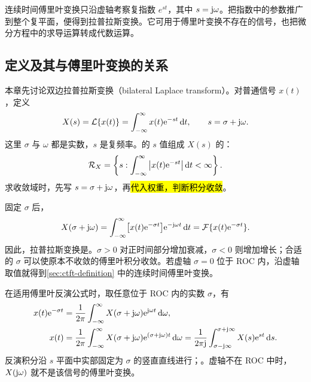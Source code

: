 连续时间傅里叶变换只沿虚轴考察复指数 $e^{st}$，其中 $s=\mathrm{j}\omega$。把指数中的参数推广到整个复平面，便得到拉普拉斯变换。它可用于傅里叶变换不存在的信号，也把微分方程中的求导运算转成代数运算。

\subsection{定义及其与傅里叶变换的关系}
\label{subsec:laplace-definition}

本章先讨论双边拉普拉斯变换（bilateral Laplace transform）。对普通信号 $x(t)$，定义
\begin{equation}
  X(s)=\mathcal{L}\{x(t)\}
  =\int_{-\infty}^{\infty}x(t)\mathrm{e}^{-st}\mathop{}\!\mathrm{d} t,
  \qquad s=\sigma+\mathrm{j}\omega.
  \label{eq:laplace-definition}
\end{equation}
这里 $\sigma$ 与 $\omega$ 都是实数，$s$ 是复频率。的 $s$ 值组成 $X(s)$ 的：
\begin{equation}
  \mathcal R_X
  =\left\{s:\int_{-\infty}^{\infty}
      \left|x(t)\mathrm{e}^{-st}\right|\mathop{}\!\mathrm{d} t<\infty\right\}.
  \label{eq:laplace-roc-definition}
\end{equation}
求收敛域时，先写 $s=\sigma+\mathrm{j}\omega$，再\hl{代入权重，判断积分收敛}。

固定 $\sigma$ 后，
\begin{equation}
  X(\sigma+\mathrm{j}\omega)
  =\int_{-\infty}^{\infty}
    \bigl[x(t)\mathrm{e}^{-\sigma t}\bigr]\mathrm{e}^{-\mathrm{j}\omega t}\mathop{}\!\mathrm{d} t
  =\mathcal{F}\{x(t)\mathrm{e}^{-\sigma t}\}.
  \label{eq:laplace-fourier-link}
\end{equation}
因此，拉普拉斯变换是。$\sigma>0$ 对正时间部分增加衰减，$\sigma<0$ 则增加增长；合适的 $\sigma$ 可以使原本不收敛的傅里叶积分收敛。若虚轴 $\sigma=0$ 位于 ROC 内，沿虚轴取值就得到\cref{sec:ctft-definition} 中的连续时间傅里叶变换。

在适用傅里叶反演公式时，取任意位于 ROC 内的实数 $\sigma$，有
\begin{align}
  x(t)\mathrm{e}^{-\sigma t}
  &=\frac{1}{2\pi}\int_{-\infty}^{\infty}
    X(\sigma+\mathrm{j}\omega)\mathrm{e}^{\mathrm{j}\omega t}\mathop{}\!\mathrm{d}\omega,\\
  x(t)
  &=\frac{1}{2\pi}\int_{-\infty}^{\infty}
    X(\sigma+\mathrm{j}\omega)\mathrm{e}^{(\sigma+\mathrm{j}\omega)t}\mathop{}\!\mathrm{d}\omega
   =\frac{1}{2\pi\mathrm{j}}
    \int_{\sigma-\mathrm{j}\infty}^{\sigma+\mathrm{j}\infty}X(s)\mathrm{e}^{st}\mathop{}\!\mathrm{d} s.
  \label{eq:laplace-inverse}
\end{align}
反演积分沿 $s$ 平面中实部固定为 $\sigma$ 的竖直直线进行；。虚轴不在 ROC 中时，$X(\mathrm{j}\omega)$ 就不是该信号的傅里叶变换。

